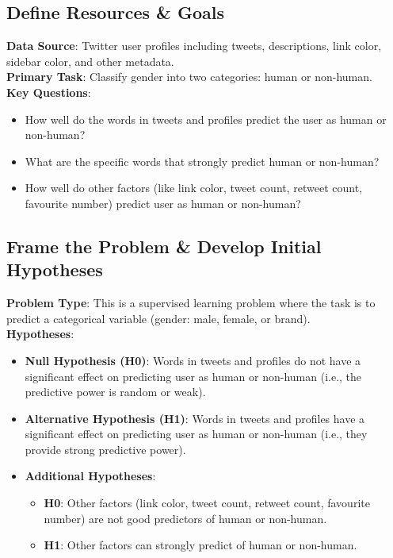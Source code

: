 \documentclass[a4paper,11pt]{article}
\begin{document}
\subsection{Define Resources \& Goals}
\textbf{Data Source}: Twitter user profiles including tweets, descriptions, link color, sidebar color, and other metadata.\\
\textbf{Primary Task}: Classify gender into two categories: human or non-human.\\
\textbf{Key Questions}:
\begin{itemize}
    \item How well do the words in tweets and profiles predict the user as human or non-human?
    \item What are the specific words that strongly predict human or non-human?
    \item How well do other factors (like link color, tweet count, retweet count, favourite number) predict user as human or non-human?
\end{itemize}

\subsection{Frame the Problem \& Develop Initial Hypotheses}
\textbf{Problem Type}: This is a supervised learning problem where the task is to predict a categorical variable (gender: male, female, or brand).\\
\textbf{Hypotheses}:
\begin{itemize}
    \item \textbf{Null Hypothesis (H0)}: Words in tweets and profiles do not have a significant effect on predicting user as human or non-human (i.e., the predictive power is random or weak).
    \item \textbf{Alternative Hypothesis (H1)}: Words in tweets and profiles have a significant effect on predicting user as human or non-human (i.e., they provide strong predictive power).
    \item \textbf{Additional Hypotheses}:
    \begin{itemize}
        \item \textbf{H0}: Other factors (link color, tweet count, retweet count, favourite number) are not good predictors of human or non-human.
        \item \textbf{H1}: Other factors can strongly predict of human or non-human.
    \end{itemize}
\end{itemize}
\end{document}
